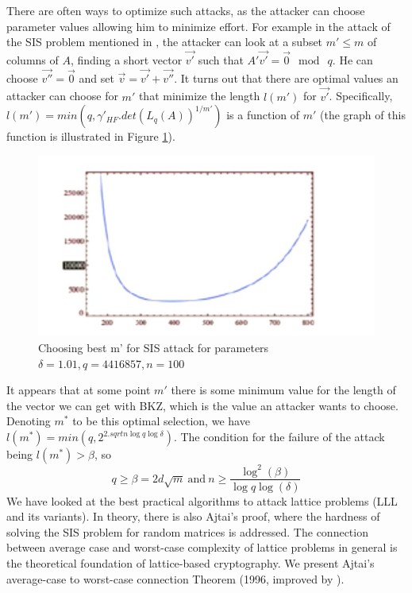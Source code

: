 There are often ways to optimize such attacks, as the attacker can choose parameter values allowing him to minimize effort. For example in the attack of the SIS problem mentioned in
\cite{micciancio2008lattice}, the attacker can look at a subset $m' \leq m$ of
columns of $A$, finding a short vector $\vec{v'}$ such that
$A'\vec{v'} = \vec{0} \mod \ q$. He can choose $\vec{v''} = \vec{0}$ and set
$\vec{v} = \vec{v'} + \vec{v''}$. It turns out that there are optimal values an attacker can choose for $m'$ that minimize the length $l(m')$ for
$\vec{v'}$.  Specifically, $l(m') = min(q,\gamma'_{HF}.det(L_q(A))^{1/m'})$ is a
function of $m'$ (the graph of this function is illustrated in Figure
\ref{fig:bestAttack}).
\begin{figure}[h]
  \centering \includegraphics[scale=0.3]{bestattack}
  \caption{Choosing best m' for SIS attack for parameters
    $\delta = 1.01, q=4416857, n=100$}
  \label{fig:bestAttack}
\end{figure}
It appears that at some point $m'$ there is some minimum value for the length of
the vector we can get with BKZ, which is the value an attacker wants to
choose. Denoting $m^*$ to be this optimal selection, we have
$l(m^*) = min(q, 2^{2.sqrt{n\log q\log \delta}})$. The condition for the failure of the attack being $l(m^*) > \beta$, so
\[
  q \geq \beta = 2d\sqrt{m} \ \text{and}\ n \geq \frac{\log^2(\beta)}{\log q
    \log(\delta)}
\]
We have looked at the best practical algorithms to attack lattice problems (LLL
and its variants). In theory, there is also Ajtai's proof, where the hardness of solving the SIS problem for random matrices is addressed. The connection between average case and  worst-case complexity of lattice problems in general is the theoretical foundation of lattice-based
cryptography. We present Ajtai's average-case to worst-case connection Theorem
(1996, improved by \cite{gentry2008trapdoors}).

